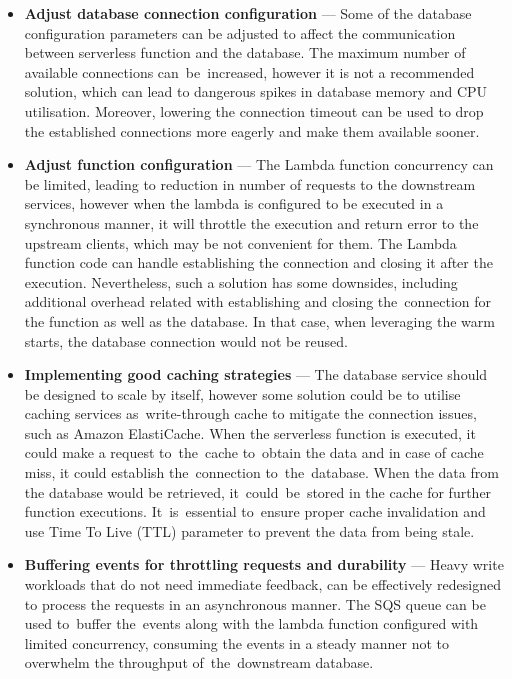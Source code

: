 \begin{itemize}
   \item \textbf{Adjust database connection configuration} ---
   Some of the database configuration parameters can be adjusted to affect the communication between serverless function and the database.
   The maximum number of available connections can~be~increased, however it is not a recommended solution, which can lead to dangerous spikes in database memory and CPU utilisation.
   Moreover, lowering the connection timeout can be used to drop the established connections more eagerly and make them available sooner.
   \item \textbf{Adjust function configuration} ---
   The Lambda function concurrency can be limited, leading to reduction in number of requests to the downstream services, however when the lambda is configured to be executed in a synchronous manner, it will throttle the execution and return error to the upstream clients, which may be not convenient for them.
   The Lambda function code can handle establishing the connection and closing it after the execution. Nevertheless, such a solution has some downsides, including additional overhead related with establishing and closing the~connection for the function as well as the database.
   In that case, when leveraging the warm starts, the database connection would not be reused.
   \item \textbf{Implementing good caching strategies} ---
   The database service should be designed to scale by itself, however some solution could be to utilise caching services as~write-through cache to mitigate the connection issues, such as Amazon ElastiCache.
   When the serverless function is executed, it could make a request to~the~cache to~obtain the data and in case of cache miss, it could establish the~connection to~the~database.
   When the data from the database would be retrieved, it~could~be~stored in the cache for further function executions.
   It~is~essential to~ensure proper cache invalidation and use Time To Live (TTL) parameter to prevent the data from being stale.
   \item \textbf{Buffering events for throttling requests and durability} ---
   Heavy write workloads that do not need immediate feedback, can be effectively redesigned to process the requests in an asynchronous manner.
   The SQS queue can be used to~buffer the~events along with the lambda function configured with limited concurrency, consuming the events in a steady manner not to overwhelm the throughput of~the~downstream database.

\end{itemize}
